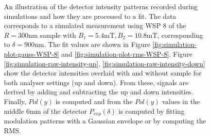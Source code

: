 \documentclass{article}
\begin{document}
\begin{figure}[htbp]
	\caption{An illustration of the detector intensity patterns recorded during simulations and how they are processed to a fit. The data corresponds to a simulated measurement using WSP 8 of the $R = 300\unit{\nano\meter}$ sample with $B_1 = 5.4\unit{\milli\tesla}, B_2 = 10.8\unit{\milli\tesla}$, corresponding to $\delta = 900 \unit{\nano\meter}$. The fit values are shown in Figure \ref{fig:simulation-plot-gauss-WSP-8} and \ref{fig:simulation-plot-rms-WSP-8}. Figure \ref{fig:simulation-raw-intensity-up}, \ref{fig:simulation-raw-intensity-down} show the detector intensities overlaid with and without sample for both analyser settings (up and down). From these, signals are derived by adding and subtracting the up and down intensities. Finally, $Pol(y)$ is computed and from the $Pol(y)$ values in the middle $6\unit{\milli\meter}$ of the detector $P_{exp}(\delta)$ is computed by fitting modulation patterns with a Gaussian envelope or by computing the RMS.}
	\label{fig:simulation-raw-intensity}
\end{figure}
\end{document}
